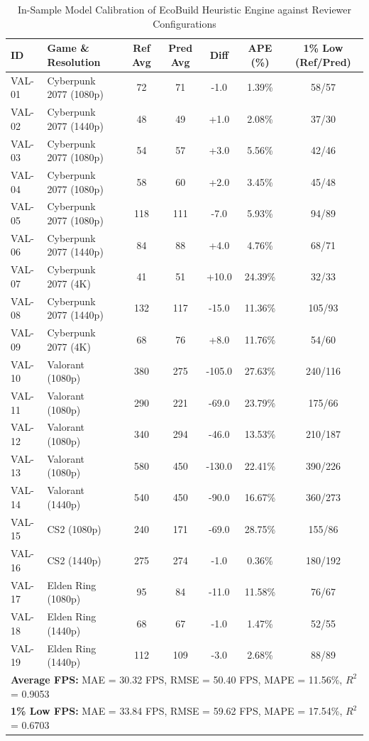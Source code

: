 \begin{table}[htbp]
\centering
\small
\caption{In-Sample Model Calibration of EcoBuild Heuristic Engine against Reviewer Configurations}
\label{tab:ecobuild_calibration_audit}
\begin{tabular}{llccccc}
\hline
\textbf{ID} & \textbf{Game \& Resolution} & \textbf{Ref Avg} & \textbf{Pred Avg} & \textbf{Diff} & \textbf{APE (\%)} & \textbf{1\% Low (Ref/Pred)} \\
\hline
VAL-01 & Cyberpunk 2077 (1080p) & 72 & 71 & -1.0 & 1.39\% & 58/57 \\
VAL-02 & Cyberpunk 2077 (1440p) & 48 & 49 & +1.0 & 2.08\% & 37/30 \\
VAL-03 & Cyberpunk 2077 (1080p) & 54 & 57 & +3.0 & 5.56\% & 42/46 \\
VAL-04 & Cyberpunk 2077 (1080p) & 58 & 60 & +2.0 & 3.45\% & 45/48 \\
VAL-05 & Cyberpunk 2077 (1080p) & 118 & 111 & -7.0 & 5.93\% & 94/89 \\
VAL-06 & Cyberpunk 2077 (1440p) & 84 & 88 & +4.0 & 4.76\% & 68/71 \\
VAL-07 & Cyberpunk 2077 (4K) & 41 & 51 & +10.0 & 24.39\% & 32/33 \\
VAL-08 & Cyberpunk 2077 (1440p) & 132 & 117 & -15.0 & 11.36\% & 105/93 \\
VAL-09 & Cyberpunk 2077 (4K) & 68 & 76 & +8.0 & 11.76\% & 54/60 \\
VAL-10 & Valorant (1080p) & 380 & 275 & -105.0 & 27.63\% & 240/116 \\
VAL-11 & Valorant (1080p) & 290 & 221 & -69.0 & 23.79\% & 175/66 \\
VAL-12 & Valorant (1080p) & 340 & 294 & -46.0 & 13.53\% & 210/187 \\
VAL-13 & Valorant (1080p) & 580 & 450 & -130.0 & 22.41\% & 390/226 \\
VAL-14 & Valorant (1440p) & 540 & 450 & -90.0 & 16.67\% & 360/273 \\
VAL-15 & CS2 (1080p) & 240 & 171 & -69.0 & 28.75\% & 155/86 \\
VAL-16 & CS2 (1440p) & 275 & 274 & -1.0 & 0.36\% & 180/192 \\
VAL-17 & Elden Ring (1080p) & 95 & 84 & -11.0 & 11.58\% & 76/67 \\
VAL-18 & Elden Ring (1440p) & 68 & 67 & -1.0 & 1.47\% & 52/55 \\
VAL-19 & Elden Ring (1440p) & 112 & 109 & -3.0 & 2.68\% & 88/89 \\
\hline
\multicolumn{7}{l}{\textbf{Average FPS:} MAE = 30.32 FPS, RMSE = 50.40 FPS, MAPE = 11.56\%, $R^2$ = 0.9053} \\
\multicolumn{7}{l}{\textbf{1\% Low FPS:}  MAE = 33.84 FPS, RMSE = 59.62 FPS, MAPE = 17.54\%, $R^2$ = 0.6703} \\
\hline
\end{tabular}
\end{table}
